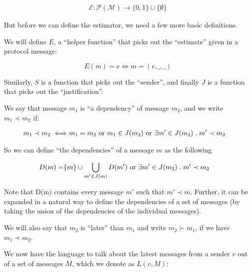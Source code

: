 \documentclass{article}
\theoremstyle{definition}
\begin{document}
\begin{equation}
\begin{split}
    \mathcal{E}:\mathcal{P}(\mathcal{M}) \to \{0, 1\} \cup \{\emptyset\}
\end{split}
\end{equation}

But before we can define the estimator, we need a few more basic definitions.

We will define $E$, a ``helper function'' that picks out the ``estimate'' given in a protocol message:

$$
E(m) = e \iff m = (e, \_, \_)
$$

Similarly, $S$ is a function that picks out the ``sender'', and finally $J$ is a function that picks out the ``justification''.  

We say that message $m_1$ is ``a dependency'' of message $m_2$, and we write $m_1 \prec m_2$ if:

\begin{equation}
\begin{split}
m_1 \prec m_2 \iff & m_1 = m_2 \text{ or } m_1 \in J(m_2) \text{ or } \exists m' \in J(m_2) \hspace{1mm} . \hspace{1mm} m' \prec m_2
\end{split}
\end{equation}

So we can define ``the dependencies'' of a message $m$ as the following

\begin{equation}
\begin{split}
D(m) = &\{m\}\cup \bigcup_{m' \in J(m)} D(m')  \text{ or } \exists m' \in J(m_2) \hspace{1mm} . \hspace{1mm} m' \prec m_2
\end{split}
\end{equation}

Note that D(m) contains every message $m'$ such that $m' \prec m$. Further, it can be expanded in a natural way to define the dependencies of a set of messages (by taking the union of the dependencies of the individual messages).

We will also say that $m_2$ is ``later'' than $m_1$ and write $m_2 \succ m_1$, if we have $m_1 \prec m_2$.

We now have the language to talk about the latest messages from a sender $v$ out of a set of messages $M$, which we denote as $L(v, M)$:
\end{document}
